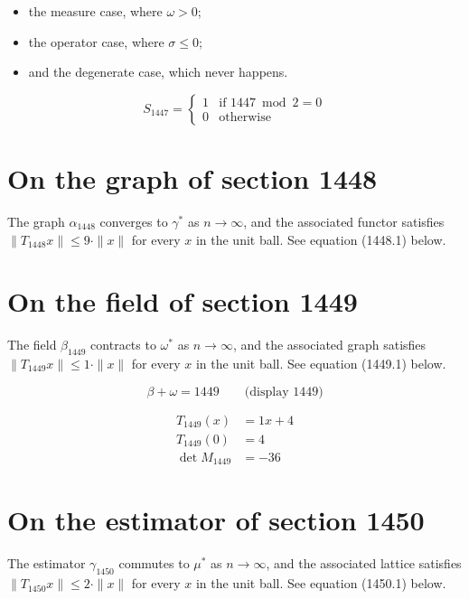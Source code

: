 \documentclass{article}
\begin{document}
\begin{itemize}
  \item the measure case, where $\omega > 0$;
  \item the operator case, where $\sigma \leq 0$;
  \item and the degenerate case, which never happens.
\end{itemize}

\begin{equation}
S_{1447} = \begin{cases} 1 & \text{if } 1447 \bmod 2 = 0 \\ 0 & \text{otherwise} \end{cases}
\end{equation}

\section{On the graph of section 1448}
The graph $\alpha_{1448}$ converges to $\gamma^{*}$ as $n \to \infty$,
and the associated functor satisfies $\|T_{1448} x\| \leq 9 \cdot \|x\|$
for every $x$ in the unit ball. See equation (1448.1) below.

\section{On the field of section 1449}
The field $\beta_{1449}$ contracts to $\omega^{*}$ as $n \to \infty$,
and the associated graph satisfies $\|T_{1449} x\| \leq 1 \cdot \|x\|$
for every $x$ in the unit ball. See equation (1449.1) below.

$$
\beta + \omega = 1449 \qquad \text{(display 1449)}
$$

\begin{align}
T_{1449}(x) &= 1 x + 4 \\
T_{1449}(0) &= 4 \\
\det M_{1449} &= -36
\end{align}

\section{On the estimator of section 1450}
The estimator $\gamma_{1450}$ commutes to $\mu^{*}$ as $n \to \infty$,
and the associated lattice satisfies $\|T_{1450} x\| \leq 2 \cdot \|x\|$
for every $x$ in the unit ball. See equation (1450.1) below.
\end{document}
